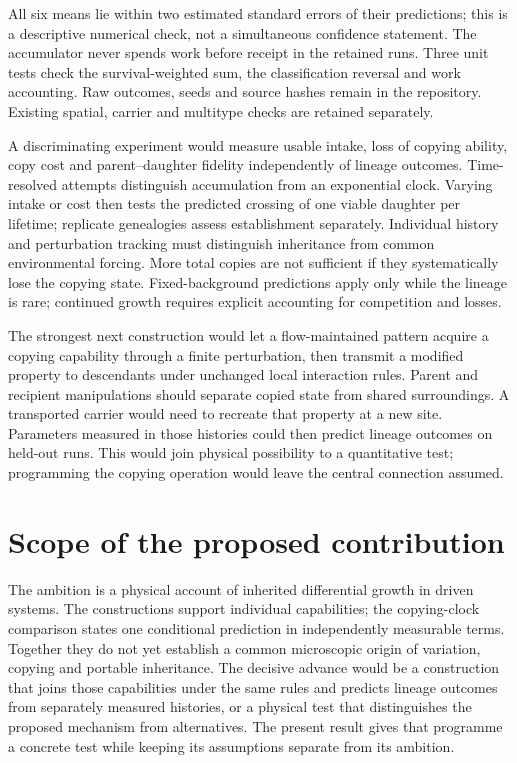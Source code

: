 \documentclass[11pt,a4paper]{article}
\begin{document}
All six means lie within two estimated standard errors of their predictions;
this is a descriptive numerical check, not a simultaneous confidence statement.
The accumulator never spends work before receipt in the retained runs. Three
unit tests check the survival-weighted sum, the classification reversal and
work accounting. Raw outcomes, seeds and source hashes remain in the repository.
Existing spatial, carrier and multitype checks are retained separately.

A discriminating experiment would measure usable intake, loss of copying ability,
copy cost and parent--daughter fidelity independently of lineage outcomes.
Time-resolved attempts distinguish accumulation from an exponential clock.
Varying intake or cost then tests the predicted crossing of one viable daughter
per lifetime; replicate genealogies assess establishment separately. Individual
history and perturbation tracking must distinguish inheritance from common
environmental forcing. More total copies are not sufficient if they systematically
lose the copying state. Fixed-background predictions apply only while the lineage
is rare; continued growth requires explicit accounting for competition and losses.

The strongest next construction would let a flow-maintained pattern acquire a
copying capability through a finite perturbation, then transmit a modified
property to descendants under unchanged local interaction rules. Parent and
recipient manipulations should separate copied state from shared surroundings.
A transported carrier would need to recreate that property at a new site.
Parameters measured in those histories could then predict lineage outcomes on
held-out runs. This would join physical possibility to a quantitative test;
programming the copying operation would leave the central connection assumed.

\section{Scope of the proposed contribution}

The ambition is a physical account of inherited differential growth in driven
systems. The constructions support individual capabilities; the copying-clock
comparison states one conditional prediction in independently measurable terms.
Together they do not yet establish a common microscopic origin of variation,
copying and portable inheritance. The decisive advance would be a construction
that joins those capabilities under the same rules and predicts lineage outcomes
from separately measured histories, or a physical test that distinguishes the
proposed mechanism from alternatives. The present result gives that programme
a concrete test while keeping its assumptions separate from its ambition.
\end{document}
